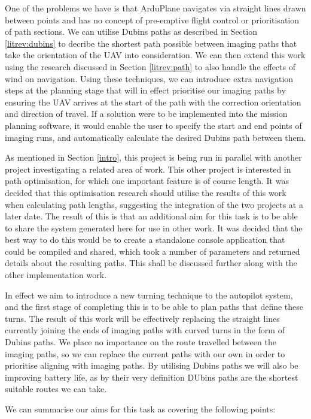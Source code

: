 One of the problems we have is that ArduPlane navigates via straight lines drawn between points and has no concept of pre-emptive flight control or prioritisation of path sections. We can utilise Dubins paths as described in Section \ref{litrev:dubins} to decribe the shortest path possible between imaging paths that take the orientation of the UAV into consideration. We can then extend this work using the research discussed in Section \ref{litrev:path} to also handle the effects of wind on navigation. Using these techniques, we can introduce extra navigation steps at the planning stage that will in effect prioritise our imaging paths by ensuring the UAV arrives at the start of the path with the correction orientation and direction of travel. If a solution were to be implemented into the mission planning software, it would enable the user to specify the start and end points of imaging runs, and automatically calculate the desired Dubins path between them. 

As mentioned in Section \ref{intro}, this project is being run in parallel with another project investigating a related area of work. This other project is interested in path optimisation, for which one important feature is of course length. It was decided that this optimisation research should utilise the results of this work when calculating path lengths, suggesting the integration of the two projects at a later date. The result of this is that an additional aim for this task is to be able to share the system generated here for use in other work. It was decided that the best way to do this would be to create a standalone console application that could be compiled and shared, which took a number of parameters and returned details about the resulting paths. This shall be discussed further along with the other implementation work.

In effect we aim to introduce a new turning technique to the autopilot system, and the first stage of completing this is to be able to plan paths that define these turns. The result of this work will be effectively replacing the straight lines currently joining the ends of imaging paths with curved turns in the form of Dubins paths. We place no importance on the route travelled between the imaging paths, so we can replace the current paths with our own in order to prioritise aligning with imaging paths. By utilising Dubins paths we will also be improving battery life, as by their very definition DUbins paths are the shortest suitable routes we can take. 

We can summarise our aims for this task as covering the following points:

